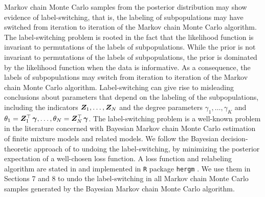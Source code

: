 Markov chain Monte Carlo samples from the posterior distribution may show evidence of label-switching,
that is,
the labeling of subpopulations may have switched from iteration to iteration of the Markov chain Monte Carlo algorithm.
The label-switching problem is rooted in the fact that the likelihood function is invariant to permutations of the labels of subpopulations.
While the prior is not invariant to permutations of the labels of subpopulations,
the prior is dominated by the likelihood function when the data is informative.
As a consequence,
the labels of subpopulations may switch from iteration to iteration of the Markov chain Monte Carlo algorithm.
Label-switching can give rise to misleading conclusions about parameters that depend on the labeling of the subpopulations,
including the indicators $\bm{Z}_1, \dots, \bm{Z}_N$ and the degree parameters $\gamma_1, \dots, \gamma_K$ and $\theta_1 = \bm{Z}_1^\top\, \mbox{\boldmath$\gamma$}, \dots, \theta_N = \bm{Z}_N^\top\, \mbox{\boldmath$\gamma$}$.
The label-switching problem is a well-known problem in the literature concerned with Bayesian Markov chain Monte Carlo estimation of finite mixture models and related models.
We follow the Bayesian decision-theoretic approach of \citet{St00} to undoing the label-switching,
by minimizing the posterior expectation of a well-chosen loss function.
A loss function and relabeling algorithm are stated in \citet{ScHa13} and implemented in {\tt R} package {\tt hergm} \citep{ScLu15}.
We use them in Sections 7 and 8 to undo the label-switching in all Markov chain Monte Carlo samples generated by the Bayesian Markov chain Monte Carlo algorithm.

